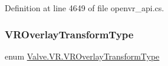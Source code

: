 Definition at line 4649 of file openvr\+\_\+api.\+cs.

\mbox{\label{namespace_valve_1_1_v_r_a92803c040c9ae49e1263b22b4d57d5fb}} 
\subsubsection{\texorpdfstring{VROverlayTransformType}{VROverlayTransformType}}
{\footnotesize\ttfamily enum \mbox{\hyperlink{namespace_valve_1_1_v_r_a92803c040c9ae49e1263b22b4d57d5fb}{Valve.\+V\+R.\+V\+R\+Overlay\+Transform\+Type}}\hspace{0.3cm}{\ttfamily [strong]}}

